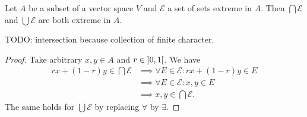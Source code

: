 \begin{lemma} \label{extremeSetsClosedUnderUnionIntersection}
Let $A$ be a subset of a vector space $V$ and $\mathcal{E}$ a set of sets extreme in $A$. Then $\bigcap\mathcal{E}$ and $\bigcup\mathcal{E}$ are both extreme in $A$.
\end{lemma}
TODO: intersection because collection of finite character.
\begin{proof}
Take arbitrary $x,y\in A$ and $r\in \interval[o]{0,1}$. We have
\begin{align*}
rx+ (1-r)y\in \bigcap\mathcal{E} &\implies \forall E\in \mathcal{E}: rx+(1-r)y\in E \\
&\implies \forall E\in \mathcal{E}: x,y\in E \\
&\implies x,y\in \bigcap\mathcal{E}.
\end{align*}
The same holds for $\bigcup \mathcal{E}$ by replacing $\forall$ by $\exists$.
\end{proof}

